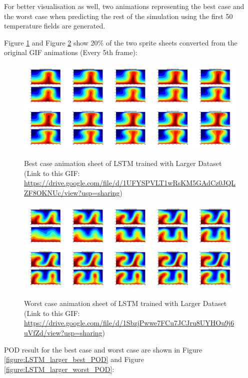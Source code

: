 For better visualisation as well, two animations representing the best case and the worst case when predicting the rest of the simulation using the first 50 temperature fields are generated.

Figure \ref{figure:LSTM_larger_best_gif} and Figure \ref{figure:LSTM_larger_worst_gif} show 20\% of the two sprite sheets converted from the original GIF animations (Every 5th frame):

\begin{figure}[H]
    \centering
    \caption{Best case animation sheet of LSTM trained with Larger Dataset (Link to this GIF: \url{https://drive.google.com/file/d/1UFYSPVLT1wRsKM5GAdCz0JQLZF8OKNUc/view?usp=sharing})}
    \includegraphics[scale=0.10]{figures/mantle_convection_images/larger_dataset/LSTM_Best_GIF_sheet.png}
    \label{figure:LSTM_larger_best_gif}
\end{figure}



\begin{figure}[H]
    \centering
    \caption{Worst case animation sheet of LSTM trained with Larger Dataset (Link to this GIF: 
    \url{https://drive.google.com/file/d/1SbzjPwwe7FCu7JCJru8UYHOu9j6uVfZd/view?usp=sharing})}
    \includegraphics[scale=0.10]{figures/mantle_convection_images/larger_dataset/LSTM_Worst_GIF_sheet.png}
    \label{figure:LSTM_larger_worst_gif}
\end{figure}

POD result for the best case and worst case are shown in Figure \ref{figure:LSTM_larger_best_POD} and Figure \ref{figure:LSTM_larger_worst_POD}:

